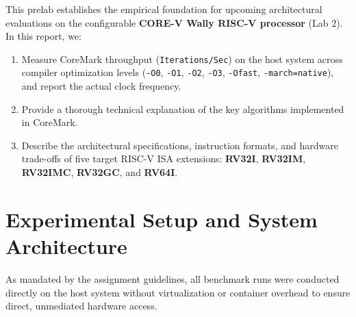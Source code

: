 \documentclass[11pt,a4paper]{article}
\begin{document}
This prelab establishes the empirical foundation for upcoming architectural evaluations on the configurable \textbf{CORE-V Wally RISC-V processor} (Lab 2). In this report, we:
\begin{enumerate}[leftmargin=1.4em]
    \item Measure CoreMark throughput (\texttt{Iterations/Sec}) on the host system across compiler optimization levels (\texttt{-O0}, \texttt{-O1}, \texttt{-O2}, \texttt{-O3}, \texttt{-Ofast}, \texttt{-march=native}), and report the actual clock frequency.
    \item Provide a thorough technical explanation of the key algorithms implemented in CoreMark.
    \item Describe the architectural specifications, instruction formats, and hardware trade-offs of five target RISC-V ISA extensions: \textbf{RV32I}, \textbf{RV32IM}, \textbf{RV32IMC}, \textbf{RV32GC}, and \textbf{RV64I}.
\end{enumerate}

\section{Experimental Setup and System Architecture}
As mandated by the assignment guidelines, all benchmark runs were conducted directly on the host system without virtualization or container overhead to ensure direct, unmediated hardware access.
\end{document}
